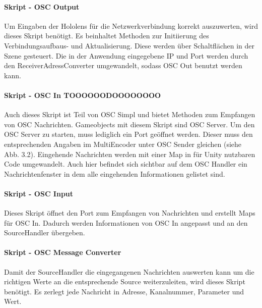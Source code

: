 \documentclass[11pt, titlepage, fleqn]{report}
\begin{document}
                    \paragraph{Skript - OSC Output} 
                    Um Eingaben der Hololens für die Netzwerkverbindung korrekt auszuwerten, wird dieses Skript benötigt. 
                    Es beinhaltet Methoden zur Initiierung des Verbindungsaufbaus- und Aktualisierung. Diese werden über 
                    Schaltflächen in der Szene gesteuert. Die in der Anwendung eingegebene IP und Port werden durch den 
                    ReceiverAdressConverter umgewandelt, sodass OSC Out benutzt werden kann.
                    \paragraph{Skript - OSC In TOOOOOODOOOOOOOO}     
                    Auch dieses Skript ist Teil von  OSC Simpl und bietet Methoden zum Empfangen von OSC Nachrichten. 
                    Gameobjects mit diesem Skript sind OSC Server. Um den OSC Server zu starten, muss lediglich ein 
                    Port geöffnet werden. Dieser muss den entsprechenden Angaben im MultiEncoder unter OSC Sender 
                    gleichen (siehe Abb. 3.2). Eingehende Nachrichten werden mit einer Map in für Unity nutzbaren Code umgewandelt. 
                    Auch hier befindet sich sichtbar auf dem OSC Handler ein Nachrichtenfenster in dem alle eingehenden 
                    Informationen gelistet sind.
                    \paragraph{Skript - OSC Input}
                    Dieses Skript öffnet den Port zum Empfangen von Nachrichten und erstellt Maps für OSC In. Dadurch werden 
                    Informationen von OSC In angepasst und an den SourceHandler übergeben.
                    \paragraph{Skript - OSC Message Converter}
                    Damit der SourceHandler die eingegangenen Nachrichten auswerten kann um die richtigen Werte an die 
                    entsprechende Source weiterzuleiten, wird dieses Skript benötigt. Es zerlegt jede Nachricht in Adresse, 
                    Kanalnummer, Parameter und Wert.
\end{document}
